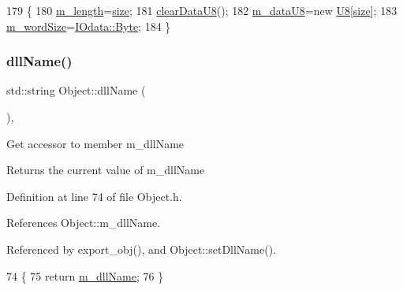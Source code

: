 \begin{DoxyCode}
179                                     \{
180     \hyperlink{classIOdata_afabe57441da019eb614d277799106aac}{m\_length}=\hyperlink{namespacecat_a3eae50bb86a614752045105e00365a46}{size};
181     \hyperlink{classIOdata_a9bc3ea0458ea6d13bd751ac4c80a4be6}{clearDataU8}();
182     \hyperlink{classIOdata_a9c4c0dc5104f7f3b170e30ab78fe61e7}{m\_dataU8}=\textcolor{keyword}{new} \hyperlink{ICECALv3_8h_a3cb25ca6f51f003950f9625ff05536fc}{U8}[\hyperlink{namespacecat_a3eae50bb86a614752045105e00365a46}{size}];
183     \hyperlink{classIOdata_a719b0ce607ada4fa91b12d6ecfa1b4c9}{m\_wordSize}=\hyperlink{classIOdata_a37c53ebf4bf8d866aac8af572962a84ca00156611f08eeb1b5d361de809dafb8e}{IOdata::Byte};
184   \}
\end{DoxyCode}
\mbox{\label{classObject_a2e3947f2870094c332d7454117f3ec63}} 
\subsubsection{\texorpdfstring{dll\+Name()}{dllName()}}
{\footnotesize\ttfamily std\+::string Object\+::dll\+Name (\begin{DoxyParamCaption}{ }\end{DoxyParamCaption})\hspace{0.3cm}{\ttfamily [inline]}, {\ttfamily [inherited]}}

Get accessor to member m\+\_\+dll\+Name \begin{DoxyReturn}{Returns}
the current value of m\+\_\+dll\+Name 
\end{DoxyReturn}


Definition at line 74 of file Object.\+h.



References Object\+::m\+\_\+dll\+Name.



Referenced by export\+\_\+obj(), and Object\+::set\+Dll\+Name().


\begin{DoxyCode}
74                        \{
75     \textcolor{keywordflow}{return} \hyperlink{classObject_a01afbeacebb8db6831559972ec362eb3}{m\_dllName};
76   \}  
\end{DoxyCode}
\mbox{\label{classIOdata_a208e24222bf2044a4ff8bbb1a6bdc13b}} 
